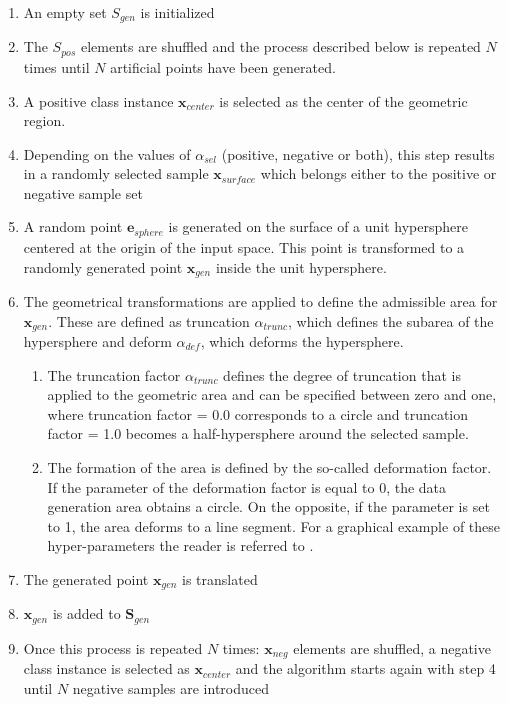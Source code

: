 \documentclass[parskip=full]{scrartcl}
\begin{document}
\begin{enumerate}
	\item 
	An empty set \( S_{gen} \) is initialized
	\item 
	The \( S_{pos} \) elements are shuffled and the process described 
	below is repeated \( N \) times until \( N \) artificial points 
	have been generated.
	\item 
	A positive class instance \( \textbf{x}_{center} \) is selected as the 
	center of the geometric region.
	\item 
	Depending on the values of \( \alpha_{sel} \) (positive, negative 
	or both), this step results in a randomly selected sample 
	\( \textbf{x}_{surface} \) which belongs either to the positive or negative 
	sample set
	\item 
	A random point \( \textbf{e}_{sphere} \) is generated on the surface of a 
	unit hypersphere centered at the origin of the input space. This point is 
	transformed to a randomly generated point \( \textbf{x}_{gen} \) inside the 
	unit hypersphere. 
	\item 
	The geometrical transformations are applied to define the admissible area 
	for \( \textbf{x}_{gen} \). These are defined as truncation 
	\( \alpha_{trunc} \), which defines the subarea of the hypersphere 
	and deform \( \alpha_{def} \), which deforms the hypersphere. 
	
	\begin{enumerate}[label=($\alph*$)]
		\item 
		The truncation factor \( \alpha_{trunc} \) defines the degree 
		of truncation that is applied to the geometric area and can be 
		specified between zero and one, where truncation factor = 0.0 
		corresponds to a circle and truncation factor = 1.0 becomes a 
		half-hypersphere around the selected sample. 
		
		\item 
		The formation of the area is defined by the so-called deformation 
		factor. If the parameter of the deformation factor is equal to 0, the 
		data generation area obtains a circle. On the opposite, if the 
		parameter is set to 1, the area deforms to a line segment. 
		For a graphical example of these hyper-parameters the reader is 
		referred to \cite{Douzas.2019}.
	\end{enumerate}

	\item 
	The generated point \( \textbf{x}_{gen} \) is translated
	\item 
	\( \textbf{x}_{gen} \) is added to \( \textbf{S}_{gen} \)
	\item 
	Once this process is repeated \( N \) times: \( \textbf{x}_{neg} \) 
	elements are shuffled, a negative class instance is selected as 
	\( \textbf{x}_{center} \) and the algorithm starts again with step 4 until 
	\( N \) negative samples are introduced
\end{enumerate}
\end{document}
